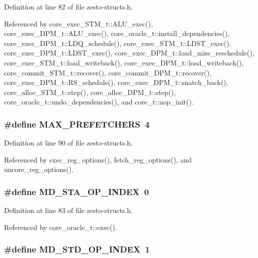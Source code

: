 Definition at line 82 of file zesto-structs.h.

Referenced by core\_\-exec\_\-STM\_\-t::ALU\_\-exec(), core\_\-exec\_\-DPM\_\-t::ALU\_\-exec(), core\_\-oracle\_\-t::install\_\-dependencies(), core\_\-exec\_\-DPM\_\-t::LDQ\_\-schedule(), core\_\-exec\_\-STM\_\-t::LDST\_\-exec(), core\_\-exec\_\-DPM\_\-t::LDST\_\-exec(), core\_\-exec\_\-DPM\_\-t::load\_\-miss\_\-reschedule(), core\_\-exec\_\-STM\_\-t::load\_\-writeback(), core\_\-exec\_\-DPM\_\-t::load\_\-writeback(), core\_\-commit\_\-STM\_\-t::recover(), core\_\-commit\_\-DPM\_\-t::recover(), core\_\-exec\_\-DPM\_\-t::RS\_\-schedule(), core\_\-exec\_\-DPM\_\-t::snatch\_\-back(), core\_\-alloc\_\-STM\_\-t::step(), core\_\-alloc\_\-DPM\_\-t::step(), core\_\-oracle\_\-t::undo\_\-dependencies(), and core\_\-t::uop\_\-init().
\subsubsection[{MAX\_\-PREFETCHERS}]{\setlength{\rightskip}{0pt plus 5cm}\#define MAX\_\-PREFETCHERS~4}\label{zesto-structs_8h_ddeae08663c23105aa48fda2f1f8954d}




Definition at line 90 of file zesto-structs.h.

Referenced by exec\_\-reg\_\-options(), fetch\_\-reg\_\-options(), and uncore\_\-reg\_\-options().
\subsubsection[{MD\_\-STA\_\-OP\_\-INDEX}]{\setlength{\rightskip}{0pt plus 5cm}\#define MD\_\-STA\_\-OP\_\-INDEX~0}\label{zesto-structs_8h_a3f75da7162ca55aee3b048479f44204}




Definition at line 83 of file zesto-structs.h.

Referenced by core\_\-oracle\_\-t::exec().
\subsubsection[{MD\_\-STD\_\-OP\_\-INDEX}]{\setlength{\rightskip}{0pt plus 5cm}\#define MD\_\-STD\_\-OP\_\-INDEX~1}\label{zesto-structs_8h_10287dcd567ba28fa022caa3a3244be5}




